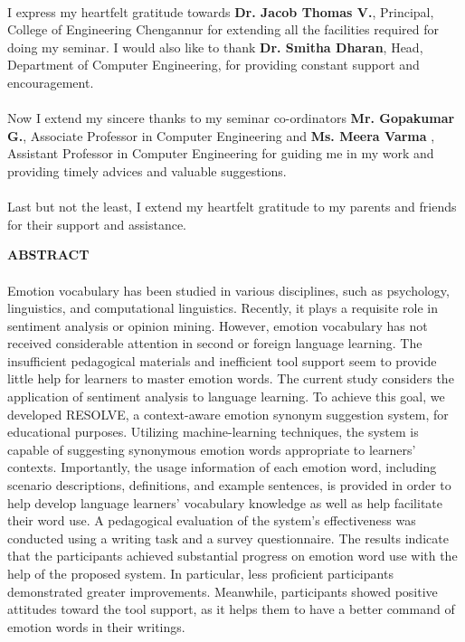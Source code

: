 \documentclass[a4paper,12pt,oneside]{article}
\begin{document}
\paragraph{}
I express my heartfelt gratitude towards \textbf{Dr. Jacob Thomas V.}, Principal, College
of Engineering Chengannur for extending all the facilities required for doing my seminar.
I would also like to thank \textbf{Dr. Smitha Dharan}, Head, Department of Computer
Engineering, for providing constant support and encouragement.
\paragraph{}
Now I extend my sincere thanks to my seminar co-ordinators \textbf{Mr. Gopakumar G.}, Associate
Professor in Computer Engineering and \textbf{Ms. Meera Varma} , Assistant
Professor in Computer Engineering for guiding me in my work and providing timely
advices and valuable suggestions.
\paragraph{}
Last but not the least, I extend my heartfelt gratitude to my parents and friends for
their support and assistance.	

\newpage

\begin{center}
\large{\textbf{ABSTRACT}}
\end{center}
\vspace{6ex}
\paragraph{}

Emotion vocabulary has been studied in various disciplines, such as psychology, linguistics, and computational linguistics. Recently, it plays a requisite role in sentiment analysis or opinion mining. However, emotion vocabulary has not received considerable attention in second or foreign language learning. The insufficient pedagogical materials and inefficient tool support seem to provide little help for learners to master emotion words. The current study considers the application of sentiment analysis to language learning. To achieve this goal, we developed RESOLVE, a context-aware emotion synonym suggestion system, for educational purposes. Utilizing machine-learning techniques, the system is capable of suggesting synonymous emotion words appropriate to learners’ contexts. Importantly, the usage information of each emotion word, including scenario descriptions, definitions, and example sentences, is provided in order to help develop language learners’ vocabulary knowledge as well as help facilitate their word use. A pedagogical evaluation of the system’s effectiveness was conducted using a writing task and a survey questionnaire. The results indicate that the participants achieved substantial progress on emotion word use with the help of the proposed system. In particular, less proficient participants demonstrated greater improvements. Meanwhile, participants showed positive attitudes toward the tool support, as it helps them to have a better command of emotion words in their writings.
\end{document}
